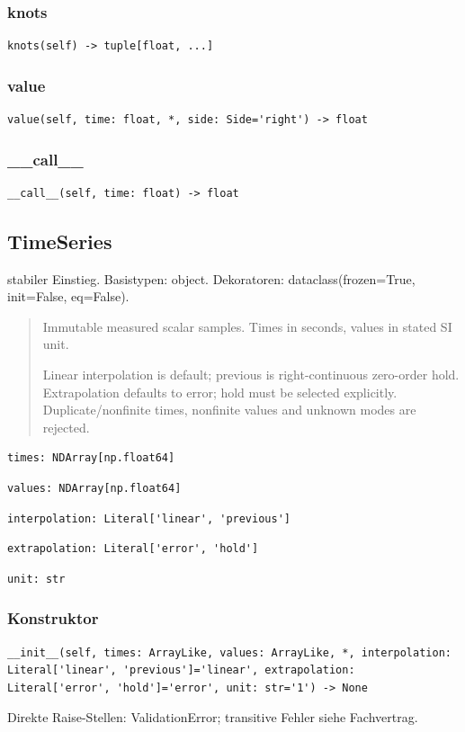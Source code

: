 \subsubsection*{knots}
\begin{lstlisting}
knots(self) -> tuple[float, ...]
\end{lstlisting}
\subsubsection*{value}
\begin{lstlisting}
value(self, time: float, *, side: Side='right') -> float
\end{lstlisting}
\subsubsection*{\_\_call\_\_}
\begin{lstlisting}
__call__(self, time: float) -> float
\end{lstlisting}
\subsection{TimeSeries}
stabiler Einstieg.
Basistypen: object. Dekoratoren: dataclass(frozen=True, init=False, eq=False).
\begin{quote}
Immutable measured scalar samples. Times in seconds, values in stated SI unit.\par Linear interpolation is default; previous is right-continuous zero-order hold. Extrapolation defaults to error; hold must be selected explicitly. Duplicate/nonfinite times, nonfinite values and unknown modes are rejected.
\end{quote}
\begin{lstlisting}
times: NDArray[np.float64]
\end{lstlisting}
\begin{lstlisting}
values: NDArray[np.float64]
\end{lstlisting}
\begin{lstlisting}
interpolation: Literal['linear', 'previous']
\end{lstlisting}
\begin{lstlisting}
extrapolation: Literal['error', 'hold']
\end{lstlisting}
\begin{lstlisting}
unit: str
\end{lstlisting}
\subsubsection*{Konstruktor}
\begin{lstlisting}
__init__(self, times: ArrayLike, values: ArrayLike, *, interpolation: Literal['linear', 'previous']='linear', extrapolation: Literal['error', 'hold']='error', unit: str='1') -> None
\end{lstlisting}
Direkte Raise-Stellen: ValidationError; transitive Fehler siehe Fachvertrag.
